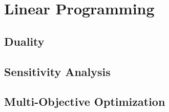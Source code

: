 \documentclass[letter,12pt]{book}
\renewcommand{\0}{\mathbf{0}}
\begin{document}
	\cleardoublepage


	\setlength{\parskip}{3.5pt} %
	\tableofcontents
	\cleardoublepage
	
	\mainmatter
	
	










\part{Linear Programming}


%





\chapter{Duality}



\chapter{Sensitivity Analysis}



\chapter{Multi-Objective Optimization}

\end{document}
